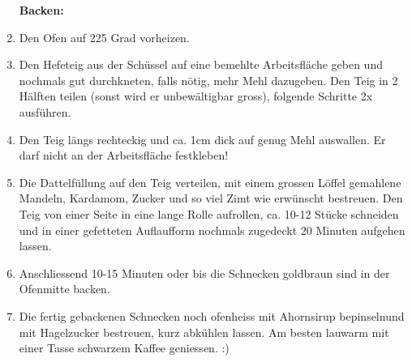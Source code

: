 \begin{recipe}
{        \begin{enumerate}
            \item [\textbf{Backen:}]
            \item Den Ofen auf 225 Grad vorheizen.
            \item Den Hefeteig aus der Schüssel auf eine bemehlte Arbeitsfläche geben und nochmals gut durchkneten, falls nötig, mehr Mehl dazugeben. Den Teig in 2 Hälften teilen (sonst wird er unbewältigbar gross), folgende Schritte 2x ausführen.
            \item Den Teig längs rechteckig und ca. 1cm dick auf genug Mehl auswallen. Er darf nicht an der Arbeitsfläche festkleben!
            \item Die Dattelfüllung auf den Teig verteilen, mit einem grossen Löffel gemahlene Mandeln, Kardamom, Zucker und so viel Zimt wie erwünscht bestreuen. Den Teig von einer Seite in eine lange Rolle aufrollen, ca. 10-12 Stücke schneiden und in einer gefetteten Auflaufform nochmals zugedeckt 20 Minuten aufgehen lassen.
            \item Anschliessend 10-15 Minuten oder bis die Schnecken goldbraun sind in der Ofenmitte backen.
            \item Die fertig gebackenen Schnecken noch ofenheiss mit Ahornsirup bepinselnund mit Hagelzucker bestreuen, kurz abkühlen lassen. Am besten lauwarm mit einer Tasse schwarzem Kaffee geniessen. :)
        \end{enumerate}
    }

%


\end{recipe}
